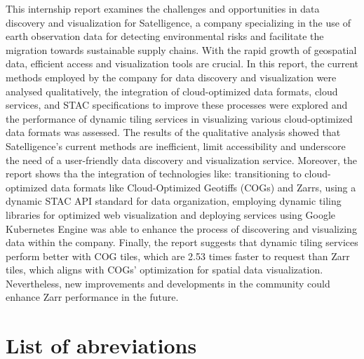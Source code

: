 \documentclass[
  oneside,
  open=any]{scrbook}
\begin{document}
This internship report examines the challenges and opportunities in data
discovery and visualization for Satelligence, a company specializing in
the use of earth observation data for detecting environmental risks and
facilitate the migration towards sustainable supply chains. With the
rapid growth of geospatial data, efficient access and visualization
tools are crucial. In this report, the current methods employed by the
company for data discovery and visualization were analysed
qualitatively, the integration of cloud-optimized data formats, cloud
services, and STAC specifications to improve these processes were
explored and the performance of dynamic tiling services in visualizing
various cloud-optimized data formats was assessed. The results of the
qualitative analysis showed that Satelligence's current methods are
inefficient, limit accessibility and underscore the need of a
user-friendly data discovery and visualization service. Moreover, the
report shows tha the integration of technologies like: transitioning to
cloud-optimized data formats like Cloud-Optimized Geotiffs (COGs) and
Zarrs, using a dynamic STAC API standard for data organization,
employing dynamic tiling libraries for optimized web visualization and
deploying services using Google Kubernetes Engine was able to enhance
the process of discovering and visualizing data within the company.
Finally, the report suggests that dynamic tiling services perform better
with COG tiles, which are 2.53 times faster to request than Zarr tiles,
which aligns with COGs' optimization for spatial data visualization.
Nevertheless, new improvements and developments in the community could
enhance Zarr performance in the future.

\newpage

\chapter*{List of abreviations}\label{list-of-abreviations}
\end{document}
